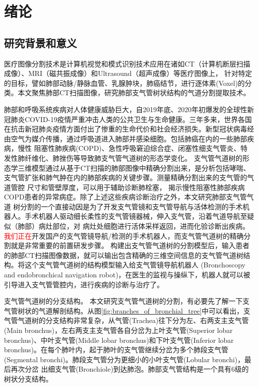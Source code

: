 
\chapter{绪论}\label{chap:introduction}

\section{研究背景和意义}

医疗图像分割技术是计算机视觉和模式识别技术应用在诸如CT（计算机断层扫描成像）、MRI（磁共振成像）和Ultrasound（超声成像）等医疗图像上，
针对特定的目标，譬如肺部动脉/静脉血管、乳腺肿块，肺癌结节，进行逐体素(Voxel)的分类。本文聚焦肺部CT扫描图像，研究肺部支气管树状结构的气道分割提取技术。


肺部和呼吸系统疾病对人体健康威胁巨大，自2019年底、2020年初爆发的全球性新冠肺炎COVID-19疫情严重冲击人类的公共卫生与生命健康。三年多来，世界各国在抗击新冠肺炎疫情方面付出了惨重的生命代价和社会经济损失。新型冠状病毒经由空气为媒介传播，通过呼吸道进入肺部并感染细胞。包括肺癌在内的一些肺部疾病，慢性
阻塞性肺疾病(COPD)\cite{fetita2004pulmonary}、急性呼吸窘迫综合症\cite{howling1998significance}、闭塞性细支气管炎\cite{shaw2002role}、特发性肺纤维化\cite{wu2019computed}、肺挫伤\cite{li2019application}等导致肺支气管气道树的形态学变化。
支气管气道树的形态学三维模型通过从基于CT扫描的肺部图像中精确分割出来，是分析包括哮喘、支气管扩张和肺气肿在内的肺部疾病的关键步骤。测量精确分割出来的支气管的气道管腔
尺寸和管壁厚度，可以用于辅助诊断肺栓塞\cite{estepar2013computed}， 揭示慢性阻塞性肺部疾病COPD患者的异常病症。除了上述这些疾病诊断治疗之外，本文研究肺部支气管气道
树分割的一个直接动因是为了开发支气管镜和支气管导航与活体检测的手术机器人。手术机器人驱动细长柔性的支气管镜器械，伸入支气管，沿着气道导航至疑似（肺部）病灶部位，对
病灶处细胞进行活体采样返回，进而化验诊断出疾病。\textcolor{red}{我们正在}开发国产的支气管镜导航/检测的手术机器人，而支气管气道树的精确分割就是非常重要的前置研发步骤。
构建出支气管气道树的分割模型后，输入患者的肺部CT扫描图像数据，就可以输出包含精确的三维空间信息的支气管气道树结构。将这个支气管气道树的结构模型输入给支气管镜导航机器人
(Bronchoscopy and endobronchical navigation robot)，在医生的监视与操纵下，机器人就可以被引导进入支气管管腔内，进行疾病的诊断与治疗了。

{\heiti 支气管气道树的分支结构。} 本文研究支气管气道树的分割，有必要先了解一下支气管树状的气道解剖结构。从图\ref{fig:branches_of_bronchial_tree}中可以看出，支气管气道树的分支结构非常复杂，从气管(Trachea)往下分为左、右两支主支气管(Main bronchus)，左右两支主支气管各自分岔为上叶支气管(Superior lobar bronchus)、中叶支气管(Middle lobar bronchus)和下叶支气管(Inferior
 lobar bronchus)。在每个肺叶内，起于肺叶的支气管继续分岔为多个肺段支气管(Segmental bronchi)。肺段支气管分为更细小的小叶支气管(Lobular bronchi)，最后再次分岔
 出细支气管(Bronchiole)到达肺泡。肺部支气管结构是一个具有6级的树状分支结构。

